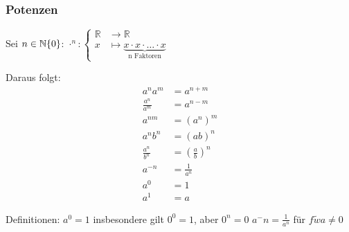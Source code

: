 \begin{multicols}{2}
\subsubsection{Potenzen}
	Sei $n \in \mathbb{N}\\\{0\}$:\space\space
	$
		\cdot^n : \begin{cases}
			\mathbb{R} &\to \mathbb{R} \\
			x &\mapsto \underbrace{x \cdot x \cdot \ldots \cdot x}_\text{n Faktoren}
		\end{cases}
	$
	
	Daraus folgt:
	\begin{align*}
		a^n a^m &= a ^{n+m} \\
		\frac{a^n}{a^m} &= a^{n-m} \\
		a^{nm} &= (a^n)^m \\
		a^n b^n &= (ab)^n \\
		\frac{a^n}{b^n} &= (\frac{a}{b})^n \\
		a^{-n} &= \frac{1}{a^n} \\
		a^0 &= 1 \\
		a^1 &= a
	\end{align*}

	Definitionen: \newline	
	$a^0 = 1$ insbesondere gilt $0^0=1$, aber $0^n=0$ \newline	
	$a^-n = \frac{1}{a^n}$ für $f\tilde{w} a \not= 0$

\end{multicols}


